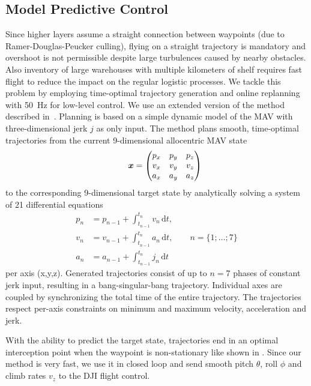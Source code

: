 \subsection{Model Predictive Control}
\label{sec:Model_Predictive_Control}
Since higher layers assume a straight connection between waypoints (due to Ramer-Douglas-Peucker culling), flying on a straight trajectory is mandatory and overshoot is not permissible despite large turbulences caused by nearby obstacles. Also inventory of large warehouses with multiple kilometers of shelf requires fast flight to reduce the impact on the regular logistic processes.
We tackle this problem by employing time-optimal trajectory generation and online replanning with \SI{50}{\hertz} for low-level control. We use an extended version of the method described in~\cite{beul2017icuas}. Planning is based on a simple dynamic model of the MAV with three-dimensional jerk $j$ as only input. 
The method plans smooth, time-optimal trajectories from the current 9-dimensional allocentric MAV state
\begin{equation*}
\hspace{2.0em}
\bm{x} =
\begin{pmatrix}
p_{x} & p_{y} & p_{z}\\
v_{x} & v_{y} & v_{z}\\
a_{x} & a_{y} & a_{z}
\end{pmatrix}
\end{equation*}
to the corresponding 9-dimensional target state by analytically solving a system of 21 differential equations
\begin{align*}
    p_{n} &= p_{n-1} + \int_{t_{n-1}}^{t_{n}}{v_{n}}\,\mathrm{d}t,\\
    v_{n} &= v_{n-1} + \int_{t_{n-1}}^{t_{n}}{a_{n}}\,\mathrm{d}t, \qquad n = \{1;\dots;7\}\\
    a_{n} &= a_{n-1} + \int_{t_{n-1}}^{t_{n}}{j_{n}}\,\mathrm{d}t
\end{align*}
per axis (x,y,z).
Generated trajectories consist of up to $n = 7$ phases of constant jerk input, resulting in a bang-singular-bang trajectory.
Individual axes are coupled by synchronizing the total time of the entire trajectory.
The trajectories respect per-axis constraints on minimum and maximum velocity, acceleration and jerk.

With the ability to predict the target state, trajectories end in an optimal interception point when the waypoint is non-stationary like shown in .
Since our method is very fast, we use it in closed loop and send smooth pitch $\theta$, roll $\phi$ and climb rates $v_{z}$ to the DJI flight control.

